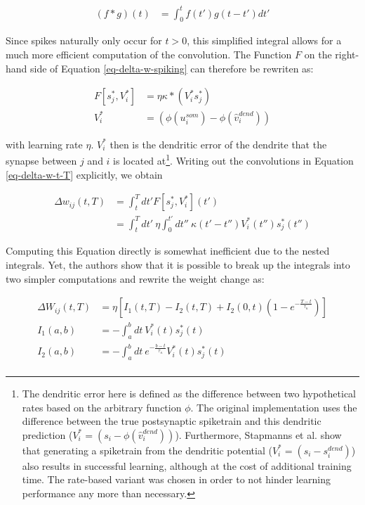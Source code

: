 \begin{align}
  (f \ast g)(t) & = \int_{0}^{t} f(t') g(t-t') d t'
\end{align}

Since spikes naturally only occur for $t>0$, this simplified integral allows for a much more efficient computation of
the convolution. The Function $F$ on the right-hand side of Equation \ref{eq-delta-w-spiking} can therefore be rewriten
as:

\begin{align}
  F[s_j^\ast, V_i^\ast] & = \eta \kappa \ast (V_i^\ast s_j^\ast)        \\
  V_i^\ast              & = (\phi(u_i^{som}) - \phi(\hat{v}_i^{dend}) )
\end{align}

with learning rate $\eta$. $V_i^\ast$ then is the dendritic error of the dendrite that the
synapse between $j$ and $i$ is located at\footnote{The dendritic error here is defined as the difference between two
hypothetical rates based on the arbitrary function $\phi$. The original implementation uses the difference between the
true postsynaptic spiketrain and this dendritic prediction ($V_i^\ast = (s_i - \phi(\hat{v}_i^{dend}) )$).
Furthermore, Stapmanns et al. show that generating a spiketrain from the dendritic potential ($V_i^\ast = (s_i -
  s_i^{dend})$) also results in successful learning, although at the cost of additional training time. The rate-based
variant was chosen in order to not hinder learning performance any more than necessary.}. Writing out the convolutions
in Equation \ref{eq-delta-w-t-T} explicitly, we obtain

\begin{align}
  \Delta w_{ij}(t,T) & = \int_t^T dt' F[s_j^\ast, V_i^\ast](t')                                                                           \\
                     & =  \int_t^T dt' \  \eta\int_0^{t'} dt'' \ \kappa(t'-t'') V_i^\ast (t'') s_j^\ast (t'') \label{eq-delta-w-t-T-long}
\end{align}

Computing this Equation directly is somewhat inefficient due to the nested integrals. Yet, the authors show that it is
possible to break up the integrals into two simpler computations and rewrite the weight change as:


\begin{align}
  \Delta W_{ij}(t, T) & = \eta \left[ I_1 (t, T) - I_2(t,T) + I_2(0,t)\left( 1- e^{-\frac{T-t}{\tau_\kappa}} \right) \right]\label{eq-proof-start} \\
  I_1(a, b)           & = -\int_{a}^{b} dt \ V_i^\ast (t) s_j^\ast (t)                                                                             \\
  I_2(a, b)           & = -\int_{a}^{b} dt \ e^{-\frac{b-t}{\tau_\kappa}} V_i^\ast (t) s_j^\ast (t)\label{eq-proof-end}                            \\
\end{align}


